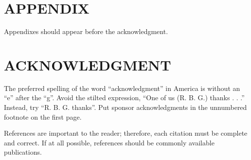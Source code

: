 \documentclass[letterpaper, 10 pt, conference]{ieeeconf}  %
\begin{document}






\section*{APPENDIX}

Appendixes should appear before the acknowledgment.

\section*{ACKNOWLEDGMENT}

The preferred spelling of the word ``acknowledgment'' in America is without an ``e'' after the ``g''. Avoid the stilted expression, ``One of us (R. B. G.) thanks . . .''  Instead, try ``R. B. G. thanks''. Put sponsor acknowledgments in the unnumbered footnote on the first page.




References are important to the reader; therefore, each citation must be complete and correct. If at all possible, references should be commonly available publications.
\end{document}

